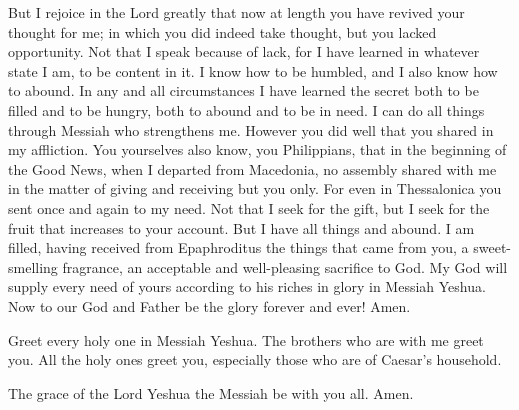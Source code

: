 \myverse{}But I rejoice in the Lord greatly that now at length you have
revived your thought for me; in which you did indeed take thought, but you lacked opportunity.
\myverse{}Not that I speak because of lack, for I have learned in whatever state I am,
to be content in it.
\myverse{}I know how to be humbled, and I also know how to abound. In any and all circumstances
I have learned the secret both to be filled and to be hungry, both to abound and to be in need.
\myverse{}I can do all things through Messiah who strengthens me.
\myverse{}However you did well that you shared in my affliction.
\myverse{}You yourselves also know, you Philippians, that in the beginning of the Good
News, when I departed from Macedonia, no assembly shared with me in the matter of giving and receiving
but you only.
\myverse{}For even in Thessalonica you sent once and again to my need.
\myverse{}Not that I seek for the gift, but I seek for the fruit that increases to your
account.
\myverse{}But I have all things and abound. I am filled, having received from Epaphroditus
the things that came from you, a sweet-smelling fragrance, an acceptable and well-pleasing sacrifice to
God.
\myverse{}My God will supply every need of yours according to his riches in glory in
Messiah Yeshua.
\myverse{}Now to our God and Father be the glory forever and ever! Amen.



\myverse{}Greet every holy one in Messiah Yeshua. The brothers who are
with me greet you.
\myverse{}All the holy ones greet you, especially those who are of Caesar’s household.

\myverse{}The grace of the Lord Yeshua the Messiah be with you all. Amen.


